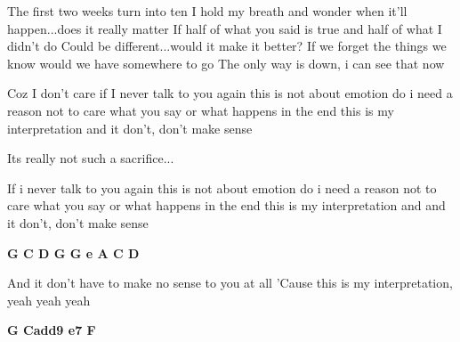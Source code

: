 \documentclass[../../../songbook.tex]{subfiles}
\begin{document}
{The first two weeks turn into ten I hold my breath and wonder  		\newline
when it'll happen...does it really matter           		\newline
If half of what you said is true and half of what I didn't do  		\newline
Could be different...would it make it better? 		\newline
If we forget the things we know would we have somewhere to go  		\newline
The only way is down, i can see that now 		\newline
   
\-\hspace{1cm} Coz I don't care if I never talk to you again 		\newline
\-\hspace{1cm} this is not about emotion do i need a reason not to care 		\newline
\-\hspace{1cm} what you say or what happens in the end 		\newline
\-\hspace{1cm} this is my interpretation and it don't, don't make sense\newline

Its really not such a sacrifice...	\newline
  
\-\hspace{1cm} If i never talk to you again 		\newline
\-\hspace{1cm} this is not about emotion do i need a reason not to care 		\newline
\-\hspace{1cm} what you say or what happens in the end  		\newline
\-\hspace{1cm} this is my interpretation and  and it don't, don't make sense 		\newline

{\color{red}\textbf{G C D G G e A C D} } \newline

And it don't have to make no sense to you at all	 \newline
'Cause this is my interpretation, yeah yeah yeah	\newline

{\color{red}\textbf{G   Cadd9  e7  F} } \newline
}
\end{document}
